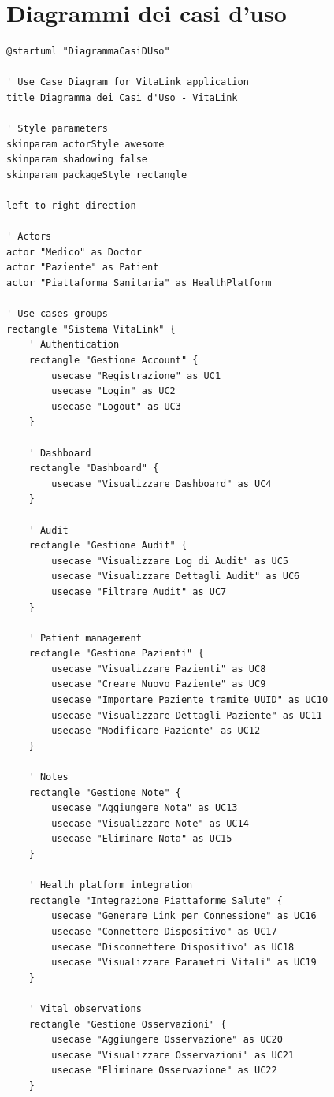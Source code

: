 \documentclass[12pt,a4paper,oneside]{report}
\begin{document}
\section{Diagrammi dei casi d'uso}
\begin{lstlisting}[basicstyle=\small\ttfamily, breaklines=true]
@startuml "DiagrammaCasiDUso"

' Use Case Diagram for VitaLink application
title Diagramma dei Casi d'Uso - VitaLink

' Style parameters
skinparam actorStyle awesome
skinparam shadowing false
skinparam packageStyle rectangle

left to right direction

' Actors
actor "Medico" as Doctor
actor "Paziente" as Patient
actor "Piattaforma Sanitaria" as HealthPlatform

' Use cases groups
rectangle "Sistema VitaLink" {
    ' Authentication
    rectangle "Gestione Account" {
        usecase "Registrazione" as UC1
        usecase "Login" as UC2
        usecase "Logout" as UC3
    }
    
    ' Dashboard
    rectangle "Dashboard" {
        usecase "Visualizzare Dashboard" as UC4
    }
    
    ' Audit
    rectangle "Gestione Audit" {
        usecase "Visualizzare Log di Audit" as UC5
        usecase "Visualizzare Dettagli Audit" as UC6
        usecase "Filtrare Audit" as UC7
    }
    
    ' Patient management
    rectangle "Gestione Pazienti" {
        usecase "Visualizzare Pazienti" as UC8
        usecase "Creare Nuovo Paziente" as UC9
        usecase "Importare Paziente tramite UUID" as UC10
        usecase "Visualizzare Dettagli Paziente" as UC11
        usecase "Modificare Paziente" as UC12
    }
    
    ' Notes
    rectangle "Gestione Note" {
        usecase "Aggiungere Nota" as UC13
        usecase "Visualizzare Note" as UC14
        usecase "Eliminare Nota" as UC15
    }
    
    ' Health platform integration
    rectangle "Integrazione Piattaforme Salute" {
        usecase "Generare Link per Connessione" as UC16
        usecase "Connettere Dispositivo" as UC17
        usecase "Disconnettere Dispositivo" as UC18
        usecase "Visualizzare Parametri Vitali" as UC19
    }
    
    ' Vital observations
    rectangle "Gestione Osservazioni" {
        usecase "Aggiungere Osservazione" as UC20
        usecase "Visualizzare Osservazioni" as UC21
        usecase "Eliminare Osservazione" as UC22
    }
    

\end{lstlisting}
\end{document}

